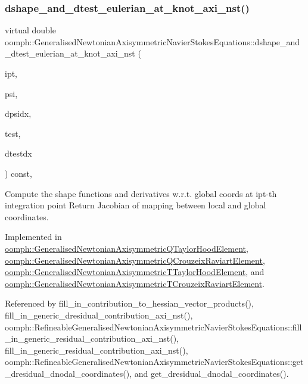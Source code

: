 \subsubsection{\texorpdfstring{dshape\+\_\+and\+\_\+dtest\+\_\+eulerian\+\_\+at\+\_\+knot\+\_\+axi\+\_\+nst()}{dshape\_and\_dtest\_eulerian\_at\_knot\_axi\_nst()}\hspace{0.1cm}{\footnotesize\ttfamily [1/2]}}
{\footnotesize\ttfamily virtual double oomph\+::\+Generalised\+Newtonian\+Axisymmetric\+Navier\+Stokes\+Equations\+::dshape\+\_\+and\+\_\+dtest\+\_\+eulerian\+\_\+at\+\_\+knot\+\_\+axi\+\_\+nst (\begin{DoxyParamCaption}\item[{const unsigned \&}]{ipt,  }\item[{\hyperlink{classoomph_1_1Shape}{Shape} \&}]{psi,  }\item[{\hyperlink{classoomph_1_1DShape}{D\+Shape} \&}]{dpsidx,  }\item[{\hyperlink{classoomph_1_1Shape}{Shape} \&}]{test,  }\item[{\hyperlink{classoomph_1_1DShape}{D\+Shape} \&}]{dtestdx }\end{DoxyParamCaption}) const\hspace{0.3cm}{\ttfamily [protected]}, {}}



Compute the shape functions and derivatives w.\+r.\+t. global coords at ipt-\/th integration point Return Jacobian of mapping between local and global coordinates. 



Implemented in \hyperlink{classoomph_1_1GeneralisedNewtonianAxisymmetricQTaylorHoodElement_a74b40fcdaa325b6b80b92856ebd7df04}{oomph\+::\+Generalised\+Newtonian\+Axisymmetric\+Q\+Taylor\+Hood\+Element}, \hyperlink{classoomph_1_1GeneralisedNewtonianAxisymmetricQCrouzeixRaviartElement_a323947d1bd37a0e58462726d69ba2efb}{oomph\+::\+Generalised\+Newtonian\+Axisymmetric\+Q\+Crouzeix\+Raviart\+Element}, \hyperlink{classoomph_1_1GeneralisedNewtonianAxisymmetricTTaylorHoodElement_ab89dde891b3757c0e93551dca7e9d005}{oomph\+::\+Generalised\+Newtonian\+Axisymmetric\+T\+Taylor\+Hood\+Element}, and \hyperlink{classoomph_1_1GeneralisedNewtonianAxisymmetricTCrouzeixRaviartElement_a6c3359adf54ac062b1a5991ef917de4f}{oomph\+::\+Generalised\+Newtonian\+Axisymmetric\+T\+Crouzeix\+Raviart\+Element}.



Referenced by fill\+\_\+in\+\_\+contribution\+\_\+to\+\_\+hessian\+\_\+vector\+\_\+products(), fill\+\_\+in\+\_\+generic\+\_\+dresidual\+\_\+contribution\+\_\+axi\+\_\+nst(), oomph\+::\+Refineable\+Generalised\+Newtonian\+Axisymmetric\+Navier\+Stokes\+Equations\+::fill\+\_\+in\+\_\+generic\+\_\+residual\+\_\+contribution\+\_\+axi\+\_\+nst(), fill\+\_\+in\+\_\+generic\+\_\+residual\+\_\+contribution\+\_\+axi\+\_\+nst(), oomph\+::\+Refineable\+Generalised\+Newtonian\+Axisymmetric\+Navier\+Stokes\+Equations\+::get\+\_\+dresidual\+\_\+dnodal\+\_\+coordinates(), and get\+\_\+dresidual\+\_\+dnodal\+\_\+coordinates().

